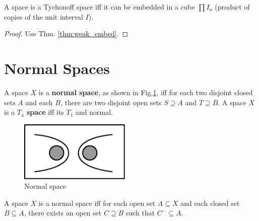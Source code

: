 \documentclass[12pt]{book}
\begin{document}
	\begin{corollary}
		A space is a Tychonoff space iff it can be embedded in a cube $\prod I_a$ (product of copies of the unit interval $I$).
		\label{col:tych_embed}
	\end{corollary}
	\begin{proof}
		Use Thm. \ref{thm:weak_embed}.
	\end{proof}


\section{Normal Spaces}
	
	\begin{definition}
		A space $X$ is a {\bf normal space}, as shown in Fig.\ref{fig:normal}, iff for each two disjoint closed sets $A$ and each $B$, there are two disjoint open sets $S\supseteq A$ and $T\supseteq B$. A space $X$ is a {\bf $T_4$ space} iff its $T_1$ and normal.
	\end{definition}
	\begin{figure}[htb!]  
		\centering  
		\includegraphics[width=150pt]{resources/chap_sep_count/normal.pdf}  
		\caption{Normal space}  
		\label{fig:normal}
	\end{figure}
	\begin{theorem}
		A space $X$ is a normal space iff for each open set $A\subseteq X$ and each closed set $B \subseteq A$, there exists an open set $C\supseteq B$ such that $C^-\subseteq A$.
	\end{theorem}
	
\end{document}
